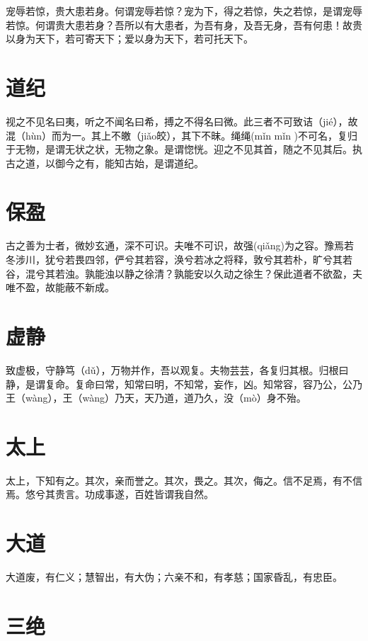 \documentclass[a4paper,12pt,UTF8,twoside]{ctexbook}
\begin{document}
	宠辱若惊，贵大患若身。何谓宠辱若惊？宠为下，得之若惊，失之若惊，是谓宠辱若惊。何谓贵大患若身？吾所以有大患者，为吾有身，及吾无身，吾有何患！故贵以身为天下，若可寄天下；爱以身为天下，若可托天下。
	
	\chapter{道纪}
	视之不见名曰夷，听之不闻名曰希，搏之不得名曰微。此三者不可致诘（jié），故混（hùn）而为一。其上不皦（jiǎo皎），其下不昧。绳绳(mǐn mǐn )不可名，复归于无物，是谓无状之状，无物之象。是谓惚恍。迎之不见其首，随之不见其后。执古之道，以御今之有，能知古始，是谓道纪。
	
	
	
	\chapter{保盈}
	
	古之善为士者，微妙玄通，深不可识。夫唯不可识，故强(qiǎng)为之容。豫焉若冬涉川，犹兮若畏四邻，俨兮其若容，涣兮若冰之将释，敦兮其若朴，旷兮其若谷，混兮其若浊。孰能浊以静之徐清？孰能安以久动之徐生？保此道者不欲盈，夫唯不盈，故能蔽不新成。
	
	
	
	\chapter{虚静}
	
	致虚极，守静笃（dǔ），万物并作，吾以观复。夫物芸芸，各复归其根。归根曰静，是谓复命。复命曰常，知常曰明，不知常，妄作，凶。知常容，容乃公，公乃王（wàng），王（wàng）乃天，天乃道，道乃久，没（mò）身不殆。
	
	

	
	
	
	\chapter{太上}
	太上，下知有之。其次，亲而誉之。其次，畏之。其次，侮之。信不足焉，有不信焉。悠兮其贵言。功成事遂，百姓皆谓我自然。
	
	\chapter{大道}
	
	大道废，有仁义；慧智出，有大伪；六亲不和，有孝慈；国家昏乱，有忠臣。
	
	
	
	\chapter{三绝}
	
\end{document}
